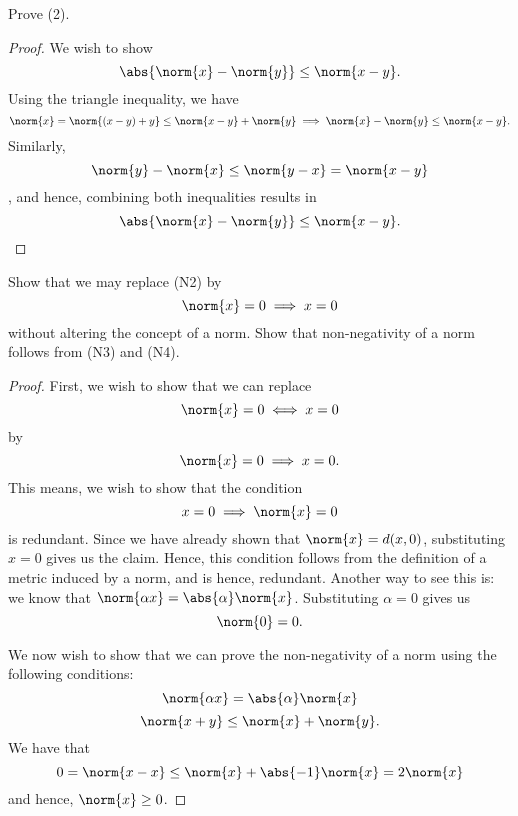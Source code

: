 \begin{question}
    Prove (2).
    \label{section2.2-3}
\end{question}
\begin{proof}
    We wish to show
    \[\abs{\norm{x} - \norm{y}} \leq \norm{x - y}.\]
    Using the triangle inequality, we have
    \[\norm{x} = \norm{(x-y) + y} \leq \norm{x-y} + \norm{y} \implies \norm{x} - \norm{y} \leq \norm{x-y}.\]
    Similarly, 
    \[\norm{y} - \norm{x} \leq \norm{y-x} = \norm{x-y}\],
    and hence, combining both inequalities results in 
    \[\abs{\norm{x} - \norm{y}} \leq \norm{x-y}.\]
\end{proof}

\begin{question}
    Show that we may replace (N2) by
    \[\norm{x} = 0 \implies x = 0\]
    without altering the concept of a norm. Show that non-negativity of a norm follows from (N3) and (N4).
    \label{section2.2-4}
\end{question}
\begin{proof}
    First, we wish to show that we can replace 
    \[\norm{x} = 0 \iff x = 0\]
    by 
    \[\norm{x} = 0 \implies x = 0.\]
    This means, we wish to show that the condition 
    \[x = 0 \implies \norm{x} = 0\]
    is redundant. Since we have already shown that $\norm{x} = d(x,0)$, substituting $x = 0$ gives us the claim. Hence, this condition follows from the definition of a metric induced by a norm, and is hence, redundant. Another way to see this is: we know that $\norm{\alpha x} = \abs{\alpha}\norm{x}$. Substituting $\alpha = 0$ gives us
    \[\norm{0} = 0.\]

    We now wish to show that we can prove the non-negativity of a norm using the following conditions:
    \[\norm{\alpha x} = \abs{\alpha}\norm{x}\]
    \[\norm{x+y} \leq \norm{x} + \norm{y}.\]
    We have that 
    \[0 = \norm{x - x} \leq \norm{x} + \abs{-1}\norm{x} = 2\norm{x}\]
    and hence, $\norm{x} \geq 0$.
\end{proof}

